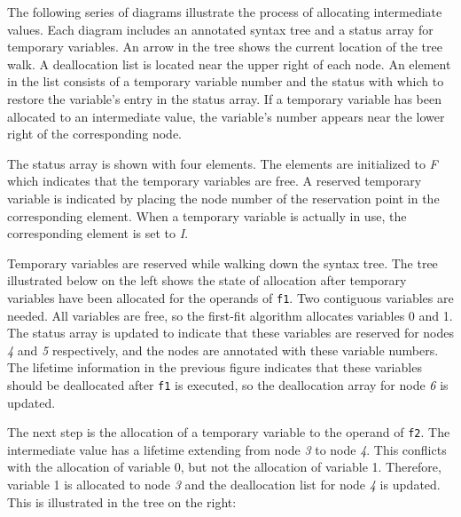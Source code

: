The following series of diagrams illustrate the process of allocating
intermediate values. Each diagram includes an annotated syntax tree
and a status array for temporary variables. An arrow in the tree shows
the current location of the tree walk. A deallocation list is located
near the upper right of each node. An element in the list consists of
a temporary variable number and the status with which to restore the
variable's entry in the status array. If a temporary variable has been
allocated to an intermediate value, the variable's number appears near
the lower right of the corresponding node.

The status array is shown with four elements. The elements are
initialized to \textit{F} which indicates that the temporary variables
are free. A reserved temporary variable is indicated by placing the
node number of the reservation point in the corresponding
element. When a temporary variable is actually in use, the
corresponding element is set to \textit{I}.

Temporary variables are reserved while walking down the syntax
tree. The tree illustrated below on the left shows the state of
allocation after temporary variables have been allocated for the
operands of \texttt{f1}. Two contiguous variables are needed. All
variables are free, so the first-fit algorithm allocates variables 0
and 1. The status array is updated to indicate that these variables
are reserved for nodes \textit{4} and \textit{5} respectively, and the
nodes are annotated with these variable numbers. The lifetime
information in the previous figure indicates that these variables
should be deallocated after \texttt{f1} is executed, so the
deallocation array for node \textit{6} is updated.

The next step is the allocation of a temporary variable to the operand
of \texttt{f2}. The intermediate value has a lifetime extending from node
\textit{3} to node \textit{4}. This conflicts with the allocation of
variable 0, but not the allocation of variable 1. Therefore, variable
1 is allocated to node \textit{3} and the deallocation list for node
\textit{4} is updated. This is illustrated in the tree on the right:

